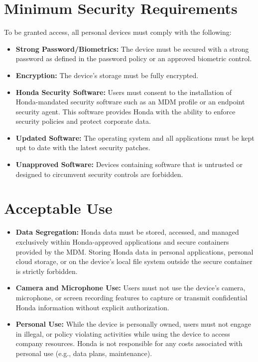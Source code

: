 \section{Minimum Security Requirements}
To be granted access, all personal devices must comply with the following:
\begin{itemize}
    \item \textbf{Strong Password/Biometrics:} The device must be secured with a strong password as defined in the password policy or an approved biometric control.
    \item \textbf{Encryption:} The device's storage must be fully encrypted.
    \item \textbf{Honda Security Software:} Users must consent to the installation of Honda-mandated security software such as an MDM profile or an endpoint security agent.  This software provides Honda with the ability to enforce security policies and protect corporate data.
    \item \textbf{Updated Software:} The operating system and all applications must be kept upt to date with the latest security patches.
    \item \textbf{Unapproved Software:} Devices containing software that is untrusted or designed to circumvent security controls are forbidden.
\end{itemize}
\section{Acceptable Use}
\begin{itemize}
    \item \textbf{Data Segregation:} Honda data must be stored, accessed, and managed exclusively within Honda-approved applications and secure containers provided by the MDM.  Storing Honda data in personal applications, personal cloud storage, or on the device's local file system outside the secure container is strictly forbidden.
    \item \textbf{Camera and Microphone Use:} Users must not use the device's camera, microphone, or screen recording features to capture or transmit confidential Honda information without explicit authorization.
    \item \textbf{Personal Use:} While the device is personally owned, users must not engage in illegal, or policy violating activities while using the device to access company resources.  Honda is not responsible for any costs associated with personal use (e.g., data plans, maintenance).
\end{itemize}
